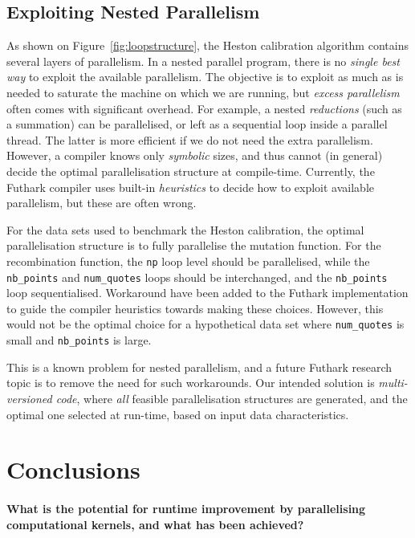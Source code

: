 \documentclass{article}
\begin{document}
\subsection{Exploiting Nested Parallelism}

As shown on Figure~\ref{fig:loopstructure}, the Heston calibration
algorithm contains several layers of parallelism.  In a nested
parallel program, there is no \textit{single best way} to exploit the
available parallelism.  The objective is to exploit as much as is
needed to saturate the machine on which we are running, but
\textit{excess parallelism} often comes with significant overhead.
For example, a nested \textit{reductions} (such as a summation) can be
parallelised, or left as a sequential loop inside a parallel thread.
The latter is more efficient if we do not need the extra parallelism.
However, a compiler knows only \textit{symbolic} sizes, and thus
cannot (in general) decide the optimal parallelisation structure at
compile-time.  Currently, the Futhark compiler uses built-in
\textit{heuristics} to decide how to exploit available parallelism,
but these are often wrong.

For the data sets used to benchmark the Heston calibration, the
optimal parallelisation structure is to fully parallelise the mutation
function.  For the recombination function, the \texttt{np} loop level
should be parallelised, while the \texttt{nb\_points} and
\texttt{num\_quotes} loops should be interchanged, and the
\texttt{nb\_points} loop sequentialised.  Workaround have been added
to the Futhark implementation to guide the compiler heuristics towards
making these choices.  However, this would not be the optimal choice
for a hypothetical data set where \texttt{num\_quotes} is small and
\texttt{nb\_points} is large.

This is a known problem for nested parallelism, and a future Futhark
research topic is to remove the need for such workarounds.  Our
intended solution is \textit{multi-versioned code}, where \textit{all}
feasible parallelisation structures are generated, and the optimal one
selected at run-time, based on input data characteristics.

\section{Conclusions}
\label{sec:conclusions}

\paragraph{What is the potential for runtime improvement by
  parallelising computational kernels, and what has been achieved?}
\end{document}
